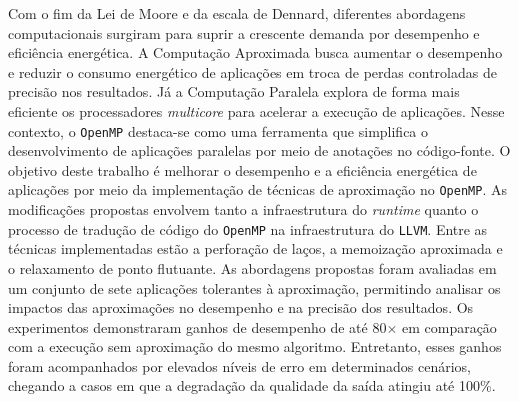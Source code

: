 \begin{resumoutfpr}
Com o fim da Lei de Moore e da escala de Dennard, diferentes abordagens computacionais surgiram para suprir a crescente demanda por desempenho e eficiência energética. A Computação Aproximada busca aumentar o desempenho e reduzir o consumo energético de aplicações em troca de perdas controladas de precisão nos resultados. Já a Computação Paralela explora de forma mais eficiente os processadores \textit{multicore} para acelerar a execução de aplicações. Nesse contexto, o \texttt{OpenMP} destaca-se como uma ferramenta que simplifica o desenvolvimento de aplicações paralelas por meio de anotações no código-fonte. O objetivo deste trabalho é melhorar o desempenho e a eficiência energética de aplicações por meio da implementação de técnicas de aproximação no \texttt{OpenMP}. As modificações propostas envolvem tanto a infraestrutura do \textit{runtime} quanto o processo de tradução de código do \texttt{OpenMP} na infraestrutura do \texttt{LLVM}. Entre as técnicas implementadas estão a perforação de laços, a memoização aproximada e o relaxamento de ponto flutuante. As abordagens propostas foram avaliadas em um conjunto de sete aplicações tolerantes à aproximação, permitindo analisar os impactos das aproximações no desempenho e na precisão dos resultados. Os experimentos demonstraram ganhos de desempenho de até 80$\times$ em comparação com a execução sem aproximação do mesmo algoritmo. Entretanto, esses ganhos foram acompanhados por elevados níveis de erro em determinados cenários, chegando a casos em que a degradação da qualidade da saída atingiu até 100\%.
\end{resumoutfpr}